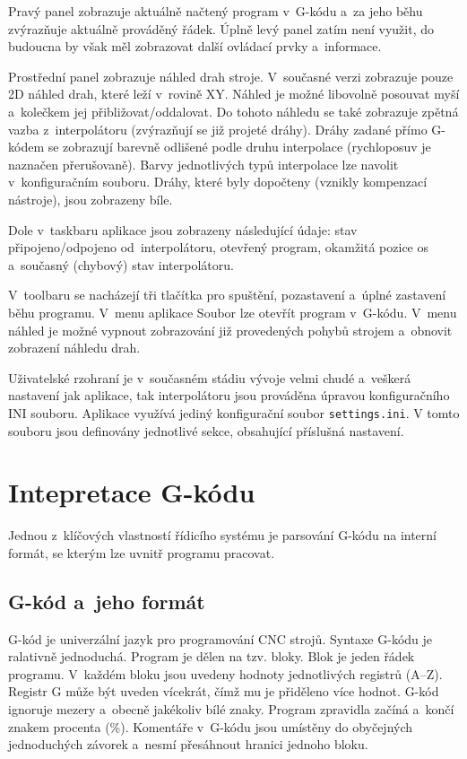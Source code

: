 	Pravý panel zobrazuje aktuálně načtený program v~G-kódu a~za jeho běhu zvýrazňuje aktuálně prováděný řádek. Úplně levý panel zatím není využit, do budoucna by však měl zobrazovat další ovládací prvky a~informace.
	
	Prostřední panel zobrazuje náhled drah stroje. V~současné verzi zobrazuje pouze 2D náhled drah, které leží v~rovině XY. Náhled je možné libovolně posouvat myší a~kolečkem jej přibližovat/oddalovat. Do tohoto náhledu se také zobrazuje zpětná vazba z~interpolátoru (zvýrazňují se již projeté dráhy). Dráhy zadané přímo G-kódem se zobrazují barevně odlišené podle druhu interpolace (rychloposuv je naznačen přerušovaně). Barvy jednotlivých typů interpolace lze navolit v~konfiguračním souboru. Dráhy, které byly dopočteny (vznikly kompenzací nástroje), jsou zobrazeny bíle.
	
	Dole v~taskbaru aplikace jsou zobrazeny následující údaje: stav připojeno/odpojeno od~interpolátoru, otevřený program, okamžitá pozice os a~současný (chybový) stav interpolátoru.
	
	V~toolbaru se nacházejí tři tlačítka pro spuštění, pozastavení a~úplné zastavení běhu programu. V~menu aplikace Soubor lze otevřít program v~G-kódu. V~menu náhled je možné vypnout zobrazování již provedených pohybů strojem a~obnovit zobrazení náhledu drah.
	
	Uživatelské rzohraní je v~současném stádiu vývoje velmi chudé a~veškerá nastavení jak aplikace, tak interpolátoru jsou prováděna úpravou konfiguračního INI souboru. Aplikace využívá jediný konfigurační soubor {\tt settings.ini}. V tomto souboru jsou definovány jednotlivé sekce, obsahující příslušná nastavení.
	
	\section{Intepretace G-kódu}
	Jednou z~klíčových vlastností řídicího systému je parsování G-kódu na interní formát, se kterým lze uvnitř programu pracovat.
		\subsection{G-kód a~jeho formát}                        \label{kap:gcodeform}
		G-kód je univerzální jazyk pro programování CNC strojů\cite{wiki:gcode}. Syntaxe G-kódu je ralativně jednoduchá. Program je dělen na tzv. bloky. Blok je jeden řádek programu. V~každém bloku jsou uvedeny hodnoty jednotlivých registrů (A--Z). Registr G může být uveden vícekrát, čímž mu je přiděleno více hodnot\cite{wiki:gcode}. G-kód ignoruje mezery a~obecně jakékoliv bílé znaky. Program zpravidla začíná a~končí znakem procenta (\%). Komentáře v~G-kódu jsou umístěny do obyčejných jednoduchých závorek a~nesmí přesáhnout hranici jednoho bloku.
		
